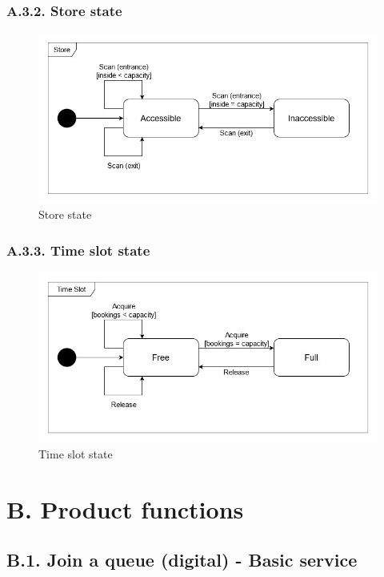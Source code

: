 \subsubsection{A.3.2. Store state}

\begin{figure}[H]
\centering
\includegraphics{state_diagrams/store_state}
\caption{Store state}
\end{figure}

\subsubsection{A.3.3. Time slot state}

\begin{figure}[H]
\centering
\includegraphics{state_diagrams/time_slot_state}
\caption{Time slot state}
\end{figure}

\clearpage
\section{B. Product functions}

\subsection{B.1. Join a queue (digital) - Basic service}

